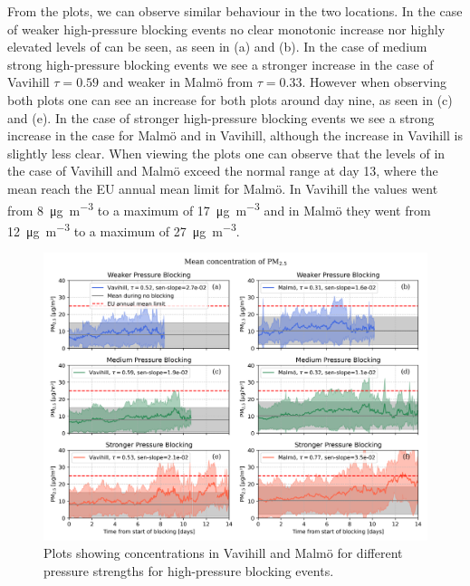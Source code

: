 From the plots, we can observe similar behaviour in the two locations. In the case of weaker high-pressure blocking events no clear monotonic increase nor highly elevated levels of \PM can be seen, as seen in (a) and (b). In the case of medium strong high-pressure blocking events we see a stronger increase in the case of Vavihill $\tau=0.59$ and weaker in Malmö from $\tau=0.33$. However when observing both plots one can see an increase for both plots around day nine, as seen in (c) and (e). In the case of stronger high-pressure blocking events we see a strong increase in the case for Malmö and in Vavihill, although the increase in Vavihill is slightly less clear. When viewing the plots one can observe that the levels of \PM in the case of Vavihill and Malmö exceed the normal range at day 13, where the mean reach the EU annual mean limit for Malmö. In Vavihill the values went from \SI{8}{\micro\gram\per\meter\cubed} to a maximum of \SI{17}{\micro\gram\per\meter\cubed} and in Malmö they went from \SI{12}{\micro\gram\per\meter\cubed} to a maximum of \SI{27}{\micro\gram\per\meter\cubed}. 

\begin{figure}[H]
    \centering
    \includegraphics[width=\textwidth]{Figures/Meanplot_pressure.png}
    \caption{Plots showing \PM concentrations in Vavihill and Malmö for different pressure strengths for high-pressure blocking events.}
    \label{fig:Meanplot_pressure}
\end{figure}

